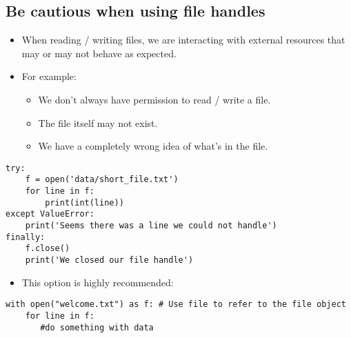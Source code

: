 \documentclass[aspectratio=1610,slidestop]{beamer}
\begin{document}
\subsection{Be cautious when using file handles}
\begin{pframe}
 \vspace{-0.2cm}
 \begin{itemize}
  \item When reading / writing files, we are interacting with external resources
  that may or may not behave as expected.
  \item For example:
  \begin{itemize}
   \item We don't always have permission to read / write a file.
   \item The file itself may not exist.
   \item We have a completely wrong idea of what's in the file.
  \end{itemize}
 \end{itemize}
 \vspace{-0.1cm}
 \begin{pythoncode}
  \begin{verbatim}
try:
    f = open('data/short_file.txt')
    for line in f:
        print(int(line))
except ValueError:
    print('Seems there was a line we could not handle')
finally:
    f.close()
    print('We closed our file handle')
  \end{verbatim}
 \end{pythoncode}
\end{pframe}

\begin{pframe}
 \begin{itemize}
  \item This option is highly recommended:
 \end{itemize}
 \begin{pythoncode}
  \begin{verbatim}
with open("welcome.txt") as f: # Use file to refer to the file object
    for line in f:
       #do something with data
  \end{verbatim}
 \end{pythoncode}

\end{pframe}
\end{document}

